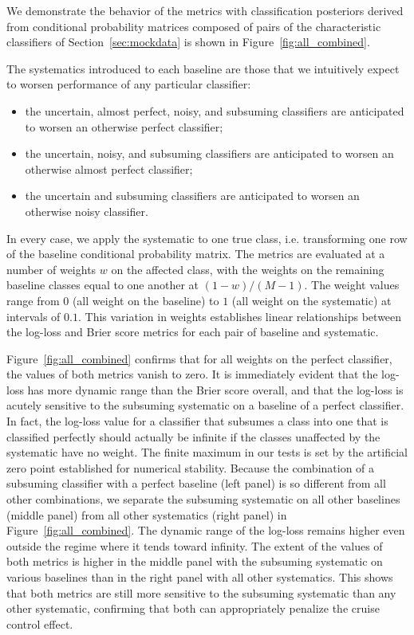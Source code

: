 We demonstrate the behavior of the metrics with classification posteriors derived from conditional probability matrices composed of pairs of the characteristic classifiers of Section~\ref{sec:mockdata} is shown in Figure~\ref{fig:all_combined}.

The systematics introduced to each baseline are those that we intuitively expect to worsen performance of any particular classifier:
\begin{itemize}
\item the uncertain, almost perfect, noisy, and subsuming classifiers are anticipated to worsen an otherwise perfect classifier;
\item the uncertain, noisy, and subsuming classifiers are anticipated to worsen an otherwise almost perfect classifier;
\item the uncertain and subsuming classifiers are anticipated to worsen an otherwise noisy classifier.
\end{itemize}
In every case, we apply the systematic to one true class, i.e. transforming one row of the baseline conditional probability matrix.
The metrics are evaluated at a number of weights $w$ on the affected class, with the weights on the remaining baseline classes equal to one another at $(1 - w) / (M - 1)$.
The weight values range from $0$ (all weight on the baseline) to $1$ (all weight on the systematic) at intervals of $0.1$.
This variation in weights establishes linear relationships between the log-loss and Brier score metrics for each pair of baseline and systematic.

Figure~\ref{fig:all_combined} confirms that for all weights on the perfect classifier, the values of both metrics vanish to zero.
It is immediately evident that the log-loss has more dynamic range than the Brier score overall, and that the log-loss is acutely sensitive to the subsuming systematic on a baseline of a perfect classifier.
In fact, the log-loss value for a classifier that subsumes a class into one that is classified perfectly should actually be infinite if the classes unaffected by the systematic have no weight.
The finite maximum in our tests is set by the artificial zero point established for numerical stability.
Because the combination of a subsuming classifier with a perfect baseline (left panel) is so different from all other combinations, we separate the subsuming systematic on all other baselines (middle panel) from all other systematics (right panel) in Figure~\ref{fig:all_combined}.
The dynamic range of the log-loss remains higher even outside the regime where it tends toward infinity.
The extent of the values of both metrics is higher in the middle panel with the subsuming systematic on various baselines than in the right panel with all other systematics.
This shows that both metrics are still more sensitive to the subsuming systematic than any other systematic, confirming that both can appropriately penalize the cruise control effect.

